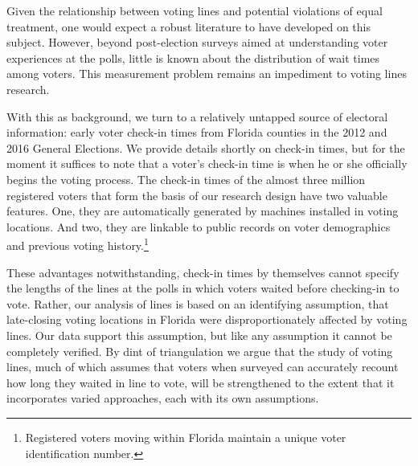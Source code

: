 \documentclass[12pt,titlepage]{article}
\begin{document}
Given the relationship between voting lines and potential violations
of equal treatment, one would expect a robust literature to have
developed on this subject.  However, beyond post-election surveys
aimed at understanding voter experiences at the polls, little is known
about the distribution of wait times among voters. This measurement
problem remains an impediment to voting lines research.

With this as background, we turn to a relatively untapped source of
electoral information: early voter check-in times from Florida
counties in the 2012 and 2016 General Elections. We provide details
shortly on check-in times, but for the moment it suffices to note that
a voter's check-in time is when he or she officially begins the voting
process.  The check-in times of the almost three million registered
voters that form the basis of our research design have two valuable
features. One, they are automatically generated by machines installed
in voting locations. And two, they are linkable to public records on
voter demographics and previous voting history.\footnote{Registered
  voters moving within Florida maintain a unique voter identification
  number.}

These advantages notwithstanding, check-in times by themselves cannot
specify the lengths of the lines at the polls in which voters waited
before checking-in to vote.  Rather, our analysis of lines is based on
an identifying assumption, that late-closing voting locations in
Florida were disproportionately affected by voting lines. Our data
support this assumption, but like any assumption it cannot be
completely verified.  By dint of triangulation we argue that the study
of voting lines, much of which assumes that voters when surveyed can
accurately recount how long they waited in line to vote, will be
strengthened to the extent that it incorporates varied approaches,
each with its own assumptions.

\end{document}
